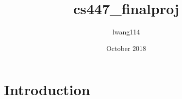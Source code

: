 \documentclass{article}
\title{cs447_finalproj}
\author{lwang114 }
\date{October 2018}
\begin{document}
\maketitle

\section{Introduction}
\end{document}
